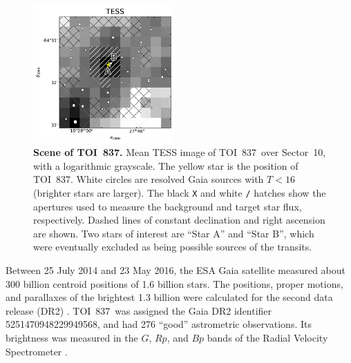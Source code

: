 \documentclass[12pt,twocolumn,tighten]{aastex63}
\newcommand{\tn}{TOI~837} %
\begin{document}
\begin{figure}[!t]
	\begin{center}
		\leavevmode
		\includegraphics[width=0.48\textwidth]{f5.pdf}
	\end{center}
	\vspace{-0.7cm}
	\caption{ {\bf Scene of \tn.}
    Mean TESS image of \tn\ over Sector~10, with a logarithmic
    grayscale. The yellow star is the position of \tn.  White circles
    are resolved Gaia sources with $T<16$ (brighter stars are larger).
    The black \texttt{X} and white \texttt{/} hatches show the
    apertures used to measure the background and target star flux,
    respectively. Dashed lines of constant declination and right
    ascension are shown.  Two stars of interest are ``Star A'' and
    ``Star B'', which were eventually excluded as being possible
    sources of the transits.
		\label{fig:scene}
	}
\end{figure}

Between 25 July 2014 and 23 May 2016, the ESA Gaia satellite measured
about 300 billion centroid positions of 1{.}6 billion stars.  The
positions, proper motions, and parallaxes of the brightest 1{.}3
billion were calculated for the second data release (DR2)
\citep{gaia_collaboration_gaia_2016,lindegren_gaiasoln_2018,gaia_collaboration_gaia_2018}.
\tn\ was assigned the Gaia DR2 identifier 5251470948229949568, and had
276 ``good'' astrometric observations. Its brightness was measured in
the $G$, $Rp$, and $Bp$ bands of the Radial Velocity Spectrometer
\citep{cropper_gaia_2018,evans_gaia_2018}.  
\end{document}
